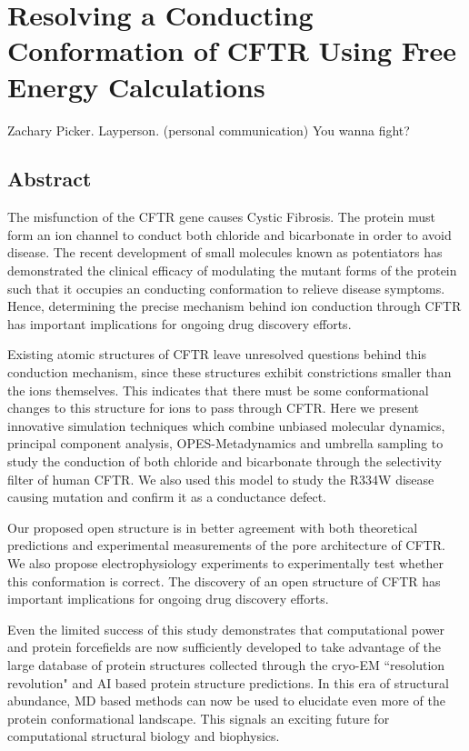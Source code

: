 \chapter{Resolving a Conducting Conformation of CFTR Using Free Energy Calculations}
\label{chap:opening}
\setcounter{figure}{0}
\renewcommand{\thefigure}{\arabic{chapter}.\arabic{figure}}
\begin{chapquote}{ Zachary Picker. Layperson. (personal communication)}
You wanna fight? 
\end{chapquote}


\section*{\centering Abstract} 
The misfunction of the CFTR gene causes Cystic Fibrosis. The protein must form an ion channel to conduct both chloride and bicarbonate in order to avoid disease. The recent development of small molecules known as potentiators has demonstrated the clinical efficacy of modulating the mutant forms of the protein such that it occupies an conducting conformation to relieve disease symptoms. Hence, determining the precise mechanism behind ion conduction through CFTR has important implications for ongoing drug discovery efforts.

Existing atomic structures of CFTR leave unresolved questions behind this conduction mechanism, since these structures exhibit constrictions smaller than the ions themselves. This indicates that there must be some conformational changes to this structure for ions to pass through CFTR. Here we present innovative simulation techniques which combine unbiased molecular dynamics, principal component analysis, OPES-Metadynamics and umbrella sampling to study the conduction of both chloride and bicarbonate through the selectivity filter of human CFTR. We also used this model to study the R334W disease causing mutation and confirm it as a conductance defect. 

Our proposed open structure is in better agreement with both theoretical predictions and experimental measurements of the pore architecture of CFTR. We also propose electrophysiology experiments to experimentally test whether this conformation is correct. The discovery of an open structure of CFTR has important implications for ongoing drug discovery efforts.

Even the limited success of this study demonstrates that computational power and protein forcefields are now sufficiently developed to take advantage of the large database of protein structures collected through the cryo-EM ``resolution revolution" and AI based protein structure predictions. In this era of structural abundance, MD based methods can now be used to elucidate even more of the protein conformational landscape. This signals an exciting future for computational structural biology and biophysics.

